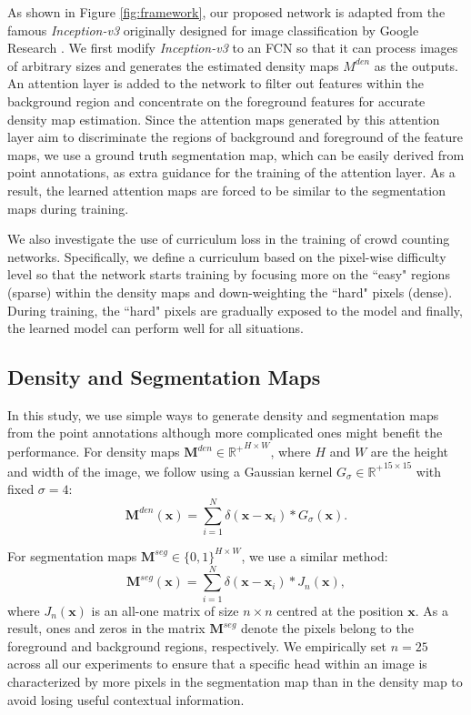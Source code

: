 \documentclass[journal,comsoc]{IEEEtran}
\begin{document}
As shown in Figure \ref{fig:framework}, our proposed network is adapted from the famous \textit{Inception-v3} originally designed for image classification by Google Research \cite{szegedy2016rethinking}. We first modify \textit{Inception-v3} to an FCN so that it can process images of arbitrary sizes and generates the estimated density maps $M^{den}$ as the outputs. An attention layer is added to the network to filter out features within the background region and concentrate on the foreground features for accurate density map estimation. Since the attention maps generated by this attention layer aim to discriminate the regions of background and foreground of the feature maps, we use a ground truth segmentation map,  which can be easily derived from point annotations, as extra guidance for the training of the attention layer. As a result, the learned attention maps are forced to be similar to the segmentation maps during training. 

We also investigate the use of curriculum loss in the training of crowd counting networks. Specifically, we define a curriculum based on the pixel-wise difficulty level so that the network starts training by focusing more on the ``easy" regions (sparse) within the density maps and down-weighting the ``hard" pixels (dense). During training, the ``hard" pixels are gradually exposed to the model and finally, the learned model can perform well for all situations.

\subsection{Density and Segmentation Maps} \label{sec:segMap}
In this study, we use simple ways to generate density and segmentation maps from the point annotations although more complicated ones \cite{shi2019counting} might benefit the performance. For density maps $\bm{M}^{den} \in \mathbb{R^+}^{H\times W}$, where $H$ and $W$ are the height and width of the image, we follow \cite{zhang2016single} using a Gaussian kernel $G_\sigma \in \mathbb{R^+}^{15\times 15}$ with fixed $\sigma=4$:
\begin{equation}\label{eq:denmap}
\bm{M}^{den}(\bm{x}) = \sum_{i=1}^N \delta(\bm{x}-\bm{x}_i)*G_{\sigma}(\bm{x}).
\end{equation}

For segmentation maps $\bm{M}^{seg} \in \{0,1\}^{H\times W}$, we use a similar method:
\begin{equation}
    \label{eq:segmap}
    \bm{M}^{seg} (\bm{x}) = \sum_{i=1}^N \delta(\bm{x}-\bm{x}_i)*J_n(\bm{x}), 
\end{equation}
where $J_n(\bm{x})$ is an all-one matrix of size $n\times n$ centred at the position $\bm{x}$. As a result, ones and zeros in the matrix $\bm{M}^{seg}$ denote the pixels belong to the foreground and background regions, respectively. We empirically set $n=25$ across all our experiments to ensure that a specific head within an image is characterized by more pixels in the segmentation map than in the density map to avoid losing useful contextual information.
\end{document}
